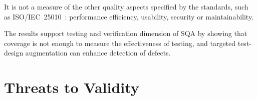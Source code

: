 \documentclass[conference]{IEEEtran}
\begin{document}
It is not a measure of the other quality aspects specified by the standards, such as ISO/IEC~25010~\cite{iso25010}: performance efficiency, usability, security or maintainability.

The results support testing and verification dimension of SQA by showing that coverage is not enough to measure the effectiveness of testing, and targeted test-design augmentation can enhance detection of defects.






\section{Threats to Validity}

\label{sec:threats}
\end{document}
